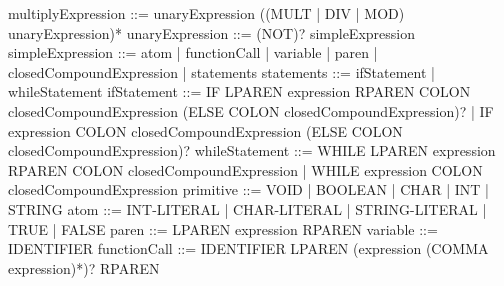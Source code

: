 \newline 
multiplyExpression          ::= unaryExpression ((MULT | DIV | MOD) unaryExpression)*
\newline 
unaryExpression             ::= (NOT)? simpleExpression
\newline   
simpleExpression            ::= atom
                              | functionCall
                              | variable
                              | paren
                              | closedCompoundExpression
                              | statements
\newline 
statements                  ::= ifStatement
                              | whileStatement
\newline 
ifStatement                 ::= IF LPAREN expression RPAREN COLON closedCompoundExpression (ELSE COLON closedCompoundExpression)? 
                              | IF expression COLON closedCompoundExpression (ELSE COLON closedCompoundExpression)?
\newline     
whileStatement              ::= WHILE LPAREN expression RPAREN COLON closedCompoundExpression
                              | WHILE expression COLON closedCompoundExpression
\newline    
primitive                   ::= VOID
                              | BOOLEAN
                              | CHAR
                              | INT
                              | STRING
\newline 
atom                        ::= INT-LITERAL
                              | CHAR-LITERAL
                              | STRING-LITERAL
                              | TRUE 
                              | FALSE
\newline 
paren                       ::= LPAREN expression RPAREN
\newline   
variable                    ::= IDENTIFIER 
\newline   
functionCall                ::= IDENTIFIER LPAREN (expression (COMMA expression)*)? RPAREN 
